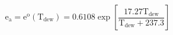 \documentclass[12pt]{article}
\begin{document}
\begin{displaymath}
\mathrm{e}_{\mathrm{a}}=\mathrm{e}^{\mathrm{o}}\left(\mathrm{T}_{\mathrm{dew}}\right)=0.6108 \exp \left[\frac{17.27 \mathrm{T}_{\mathrm{dew}}}{\mathrm{T}_{\mathrm{dew}}+237.3}\right]
\end{displaymath}
\end{document}
